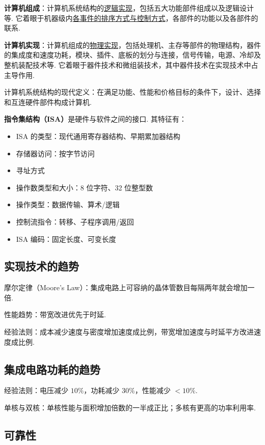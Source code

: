 \documentclass[cn, hazy, blue, normal, 12pt]{elegantnote}
\begin{document}
\textbf{计算机组成}：计算机系统结构的\underline{逻辑实现}，包括五大功能部件组成以及逻辑设计等. 它着眼于机器级内\underline{各事件的排序方式与控制方式}，各部件的功能以及各部件的联系.

\textbf{计算机实现}：计算机组成的\underline{物理实现}，包括处理机、主存等部件的物理结构，器件的集成度和速度功耗，模块、插件、底板的划分与连接，信号传输，电源、冷却及整机装配技术等. 它着眼于器件技术和微组装技术，其中器件技术在实现技术中占主导作用.

计算机系统结构的现代定义：在满足功能、性能和价格目标的条件下，设计、选择和互连硬件部件构成计算机.

\textbf{指令集结构（ISA）}是硬件与软件之间的接口. 其特征有：

\begin{itemize}
    \item ISA 的类型：现代通用寄存器结构、早期累加器结构
    \item 存储器访问：按字节访问
    \item 寻址方式
    \item 操作数类型和大小：8 位字符、32 位整型数
    \item 操作类型：数据传输、算术/逻辑
    \item 控制流指令：转移、子程序调用/返回
    \item ISA 编码：固定长度、可变长度
\end{itemize}

\subsection{实现技术的趋势}

摩尔定律（Moore's Law）：集成电路上可容纳的晶体管数目每隔两年就会增加一倍.

性能趋势：带宽改进优先于时延.

经验法则：成本减少速度与密度增加速度成比例，带宽增加速度与时延平方改进速度成比例.

\subsection{集成电路功耗的趋势}

经验法则：电压减少 $10\%$，功耗减少 $30\%$，性能减少 $<10\%$.

单核与双核：单核性能与面积增加倍数的一半成正比；多核有更高的功率利用率.

\subsection{可靠性}
\end{document}
